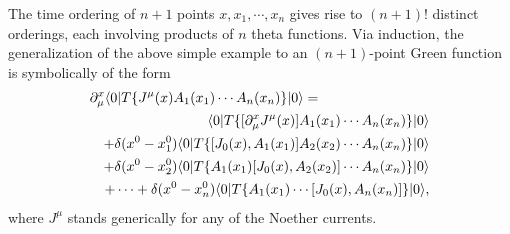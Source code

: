 \documentclass[twoside,12pt]{article}
\begin{document}
   The time ordering of $n+1$ points $x,x_1,\cdots,x_n$ gives rise to $(n+1)$! distinct orderings, each
involving products of $n$ theta functions.
   Via induction, the generalization of the above simple example to an
$(n+1)$-point Green function is symbolically of the form
\begin{eqnarray}
\label{2:1:6:gendmug}
\lefteqn{\partial_\mu^x \langle 0|T\{J^\mu(x) A_1(x_1)\cdots A_n(x_n)
\}|0\rangle=}\nonumber\\
&&\langle 0|T\{[\partial_\mu^x J^\mu(x)]
A_1(x_1)\cdots A_n(x_n)\}|0\rangle\nonumber\\
&&+\delta(x^0-x_1^0)\langle 0|T\{[J_0(x),A_1(x_1)] A_2(x_2)\cdots A_n(x_n)\}|
0\rangle\nonumber\\
&&+\delta(x^0-x_2^0)\langle 0|T\{A_1(x_1)[J_0(x),A_2(x_2)]
\cdots A_n(x_n)\}|0\rangle\nonumber\\
&&+\cdots+\delta(x^0-x_n^0)
\langle 0|T\{A_1(x_1)\cdots [J_0(x),A_n(x_n)]\}|0\rangle,
\end{eqnarray}
where $J^\mu$ stands generically for any of the Noether currents.
\end{document}

